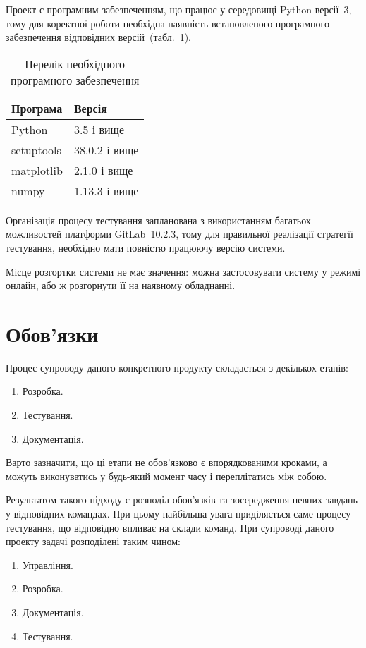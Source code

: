 \documentclass[a4paper,oneside,DIV=12,12pt]{scrartcl}
\begin{document}
		Проект є програмним забезпеченням, що працює у середовищі Python версії~3, тому для коректної роботи необхідна наявність встановленого програмного забезпечення відповідних версій~(табл.~\ref{tab:tool-requirements}).
		
		\begin{table}[!htbp]
		\centering
			\begin{tabular}{ll}
				\toprule
					Програма & Версія\\
				\midrule
					Python     & 3.5 і вище\\
					setuptools & 38.0.2 і вище\\
					matplotlib & 2.1.0 і вище\\
					numpy      & 1.13.3 і вище\\
				\bottomrule
			\end{tabular}
		\caption{Перелік необхідного програмного забезпечення}
		\label{tab:tool-requirements}
		\end{table}
		
		Організація процесу тестування запланована з використанням багатьох можливостей платформи GitLab~10.2.3, тому для правильної реалізації стратегії тестування, необхідно мати повністю працюючу версію системи.
		
		Місце розгортки системи не має значення: можна застосовувати систему у режимі онлайн, або ж розгорнути її на наявному обладнанні.
	
	\section{Обов'язки}
		\label{sec:responsibilities}
		Процес супроводу даного конкретного продукту складається з декількох етапів:
		\begin{enumerate}
			\item Розробка.
			\item Тестування.
			\item Документація.
		\end{enumerate}
		Варто зазначити, що ці етапи не обов'язково є впорядкованими кроками, а можуть виконуватись у будь-який момент часу і переплітатись між собою.
		
		Результатом такого підходу є розподіл обов'язків та зосередження певних завдань у відповідних командах. При цьому найбільша увага приділяється саме процесу тестування, що відповідно впливає на склади команд. При супроводі даного проекту задачі розподілені таким чином:
		\begin{enumerate}
			\item Управління.
			\item Розробка.
			\item Документація.
			\item Тестування.
		\end{enumerate}
	
\end{document}
